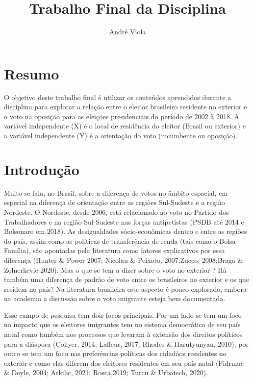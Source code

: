\documentclass{article}
\title{Trabalho Final da Disciplina}
\author{André Viola}
\begin{document}
  \onehalfspacing

\maketitle











\section*{Resumo}

O objetivo deste trabalho final é utilizar os conteúdos aprendidos durante a disciplina para explorar a relação entre o eleitor brasileiro residente no exterior e o voto na oposição para as eleições presidenciais do período de 2002 à 2018. A variável independente (X) é o local de residência do eleitor (Brasil ou exterior) e a variável independente (Y) é a orientação do voto (incumbente ou oposição).

\section{Introdução}

Muito se fala, no Brasil, sobre a diferença de votos no âmbito espacial, em especial na diferença de orientação entre as regiões Sul-Sudeste e a região Nordeste. O Nordeste, desde 2006, está relacionado ao voto no Partido dos Trabalhadores e na região Sul-Sudeste nas forças antipetistas (PSDB até 2014 e Bolsonaro em 2018). As desigualdades sócio-econômicas dentro e entre as regiões do país, assim como as políticas de transferência de renda (tais como o Bolsa Família), são apontadas pela literatura como fatores explicativos por essa diferença (Hunter \& Power 2007; Nicolau \& Peixoto, 2007;Zucco, 2008;Braga \& Zolnerkevic 2020). Mas o que se tem a dizer sobre o voto no exterior ? Há também uma diferença de padrão de voto entre os brasileiros no exterior e os que residem no país? Na literatura brasileira este aspecto é pouco explorado, embora na academia a discussão sobre o voto imigrante esteja bem documentada. 

Esse campo de pesquisa tem dois focos principais. Por um lado se tem um foco no impacto que os eleitores imigrantes tem no sistema democrático de seu país natal como também nos processos que levaram à extensão dos direitos políticos para a diáspora (Collyer, 2014; Lafleur, 2017; Rhodes \& Harutyunyan, 2010), por outro se tem um foco nas preferências políticas dos cidadãos residentes no exterior e como elas diferem dos eleitores residentes em seu país natal (Fidrmuc \& Doyle, 2004; Arkilic, 2021; Rosca,2019; Turcu \& Urbatsch, 2020).
\end{document}
